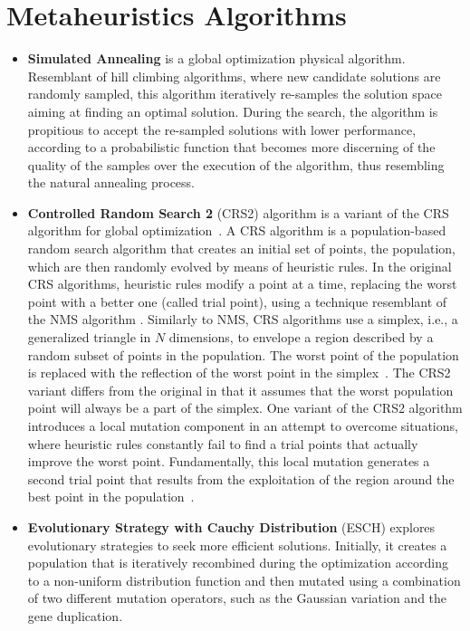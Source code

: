 \section{Metaheuristics Algorithms}
\begin{itemize}
	
	\item \textbf{Simulated Annealing} \cite{Brownlee2011} is a global optimization physical algorithm. Resemblant of hill climbing algorithms, where new candidate solutions are randomly sampled, this algorithm iteratively re-samples the solution space aiming at finding an optimal solution. During the search, the algorithm is propitious to accept the re-sampled solutions with lower performance, according to a probabilistic function that becomes more discerning of the quality of the samples over the execution of the algorithm, thus resembling the natural annealing process. 
	
	\item \textbf{Controlled Random Search 2} (CRS2) algorithm is a variant of the CRS algorithm for global optimization~\cite{Price1983}. A CRS algorithm is a population-based random search algorithm that creates an initial set of points, the population, which are then randomly evolved by means of heuristic rules. In the original CRS algorithms, heuristic rules modify a point at a time, replacing the worst point with a better one (called trial point), using a technique resemblant of the NMS algorithm \cite{Nelder1964}. Similarly to NMS, CRS algorithms use a simplex, i.e., a generalized triangle in $N$ dimensions, to envelope a region described by a random subset of points in the population. The worst point of the population is replaced with the reflection of the worst point in the simplex~\cite{Kaelo2006CRS2}. The CRS2 variant differs from the original in that it assumes that the worst population point will always be a part of the simplex. One variant of the CRS2 algorithm introduces a local mutation component in an attempt to overcome situations,  where heuristic rules constantly fail to find a trial points that actually improve the worst point. Fundamentally, this local mutation generates a second trial point that results from the exploitation of the region around the best point in the population~\cite{Kaelo2006CRS2}.  
	
	\item \textbf{Evolutionary Strategy with Cauchy Distribution} (ESCH) \cite{Santos2010} explores evolutionary strategies to seek more efficient solutions. Initially, it creates a population that is iteratively recombined during the optimization according to a non-uniform distribution function and then mutated using a combination of two different mutation operators, such as the Gaussian variation and the gene duplication.
	

\end{itemize}
